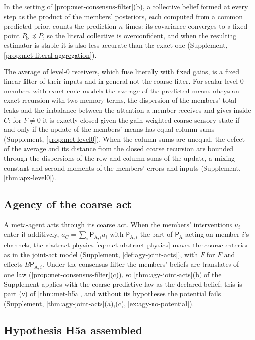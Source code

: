 In the setting of \cref{prop:met-consensus-filter}(b), a collective belief formed at every step as the product of the members' posteriors, each computed from a common predicted prior, counts the prediction $n$ times: its covariance converges to a fixed point $P_{\mathrm b}\preceq\bar P$, so the literal collective is overconfident, and when the resulting estimator is stable it is also less accurate than the exact one (Supplement, \cref{prop:met-literal-aggregation}).

The average of level-0 receivers, which fuse literally with fixed gains, is a fixed linear filter of their inputs and in general not the coarse filter. For scalar level-0 members with exact code models the average of the predicted means obeys an exact recursion with two memory terms, the dispersion of the members' total leaks and the imbalance between the attention a member receives and gives inside $C$; for $F\neq0$ it is exactly closed given the gain-weighted coarse sensory state if and only if the update of the members' means has equal column sums (Supplement, \cref{prop:met-level0}). When the column sums are unequal, the defect of the average and its distance from the closed coarse recursion are bounded through the dispersions of the row and column sums of the update, a mixing constant and second moments of the members' errors and inputs (Supplement, \cref{thm:apx-level0}).

\subsection{Agency of the coarse act}\label{sec:met-agency}

A meta-agent acts through its coarse act. When the members' interventions $u_i$ enter it additively, $a_C=\sum_i\mathsf P_{\mathrm A,i}u_i$ with $\mathsf P_{\mathrm A,i}$ the part of $\mathsf P_{\mathrm A}$ acting on member $i$'s channels, the abstract physics \eqref{eq:met-abstract-physics} moves the coarse exterior as in the joint-act model (Supplement, \cref{def:agy-joint-acts}), with $\bar F$ for $F$ and effects $\bar B\mathsf P_{\mathrm A,i}$. Under the consensus filter the members' beliefs are translates of one law (\cref{prop:met-consensus-filter}(c)), so \cref{thm:agy-joint-acts}(b) of the Supplement applies with the coarse predictive law as the declared belief; this is part (v) of \cref{thm:met-h5a}, and without its hypotheses the potential fails (Supplement, \cref{thm:agy-joint-acts}(a),(c), \cref{ex:agy-no-potential}).

\subsection{Hypothesis H5a assembled}\label{sec:met-h5a}

